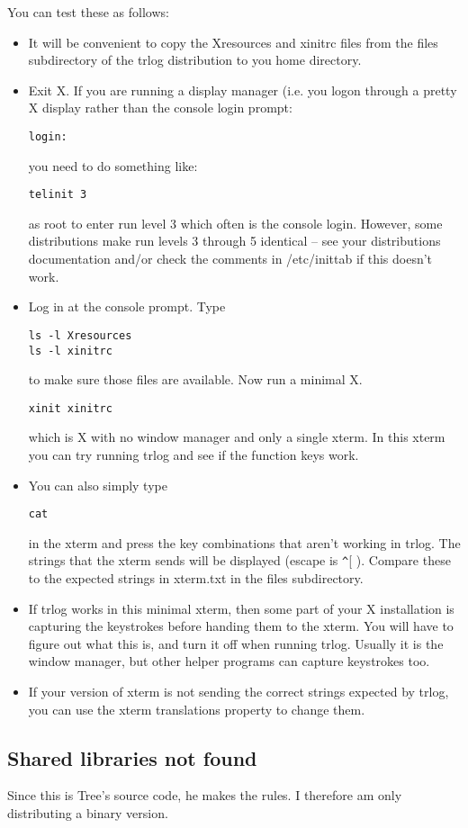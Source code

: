 \documentclass[12pt]{article}
\begin{document}
You can test these as follows:
\begin{itemize}
\item
It will be convenient to copy the Xresources and xinitrc files
from the files subdirectory of the trlog distribution to you home directory.
\item
Exit X. If you are running a display manager (i.e. you logon through a
pretty X display rather than the console login prompt:
\begin{verbatim}
login:
\end{verbatim}
you need to do something like:
\begin{verbatim}
telinit 3
\end{verbatim}
as root to enter run level 3 which often is the console login. However,
some distributions make run levels 3 through 5 identical -- see your
distributions documentation and/or check
the comments in /etc/inittab if this doesn't work.
\item
Log in at the console prompt. Type
\begin{verbatim}
ls -l Xresources
ls -l xinitrc
\end{verbatim}
to make sure those files are available.
Now run a minimal X.
\begin{verbatim}
xinit xinitrc
\end{verbatim}
which is X with no window manager and only a single xterm. In this xterm
you can try running trlog and see if the function keys work.
\item
You can also simply type
\begin{verbatim}
cat
\end{verbatim}
in the xterm and press the key combinations that aren't working in trlog.
The strings that the xterm sends will be displayed (escape is \verb|^|[ ).
Compare these to the expected strings in xterm.txt in the files subdirectory.

\item
If trlog works in this minimal xterm,
then some part of your X installation is capturing the
keystrokes before handing them to the xterm.
You will have to figure out what this is, and turn it off when running
trlog.
Usually it is the window manager, but other helper programs can capture
keystrokes too.
\item
If your version of xterm is not sending the correct strings expected
by trlog, you can
use the xterm translations property to change them. 

\end{itemize}
\subsection{Shared libraries not found}
Since this is Tree's source code, he makes the rules.
I therefore am only distributing a binary version.
\end{document}
